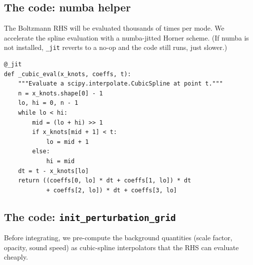 \subsection{The code: numba helper}

The Boltzmann RHS will be evaluated thousands of times per mode. We accelerate the spline evaluation with a numba-jitted Horner scheme. (If numba is not installed, \texttt{\_jit} reverts to a no-op and the code still runs, just slower.)

\begin{codebox}
\begin{lstlisting}[style=python]
@_jit
def _cubic_eval(x_knots, coeffs, t):
    """Evaluate a scipy.interpolate.CubicSpline at point t."""
    n = x_knots.shape[0] - 1
    lo, hi = 0, n - 1
    while lo < hi:
        mid = (lo + hi) >> 1
        if x_knots[mid + 1] < t:
            lo = mid + 1
        else:
            hi = mid
    dt = t - x_knots[lo]
    return ((coeffs[0, lo] * dt + coeffs[1, lo]) * dt
            + coeffs[2, lo]) * dt + coeffs[3, lo]
\end{lstlisting}
\end{codebox}

\subsection{The code: \texttt{init\_perturbation\_grid}}

Before integrating, we pre-compute the background quantities (scale factor, opacity, sound speed) as cubic-spline interpolators that the RHS can evaluate cheaply.


